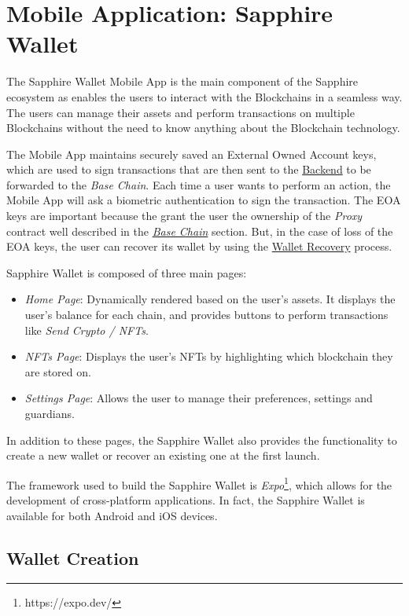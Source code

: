 \section{Mobile Application: Sapphire Wallet}
\label{sec:mobile_application}

The Sapphire Wallet Mobile App is the main component of the Sapphire ecosystem as enables the users to interact with the Blockchains in a seamless way. The users can manage their assets and perform transactions on multiple Blockchains without the need to know anything about the Blockchain technology.

The Mobile App maintains securely saved an External Owned Account keys, which are used to sign transactions that are then sent to the \hyperref[sec:backend]{Backend} to be forwarded to the \textit{Base Chain}. Each time a user wants to perform an action, the Mobile App will ask a biometric authentication to sign the transaction. The EOA keys are important because the grant the user the ownership of the \textit{Proxy} contract well described in the \hyperref[subsec:base_chain]{\textit{Base Chain}} section. But, in the case of loss of the EOA keys, the user can recover its wallet by using the \hyperref[subsec:wallet_recovery]{Wallet Recovery} process.

Sapphire Wallet is composed of three main pages:
\begin{itemize}
    \item \textit{Home Page}: Dynamically rendered based on the user's assets. It displays the user's balance for each chain, and provides buttons to perform transactions like \textit{Send Crypto / NFTs}.
    \item \textit{NFTs Page}: Displays the user's NFTs by highlighting which blockchain they are stored on.
    \item \textit{Settings Page}: Allows the user to manage their preferences, settings and guardians. 
\end{itemize}

In addition to these pages, the Sapphire Wallet also provides the functionality to create a new wallet or recover an existing one at the first launch.

The framework used to build the Sapphire Wallet is \textit{Expo}\footnote{https://expo.dev/}, which allows for the development of cross-platform applications. In fact, the Sapphire Wallet is available for both Android and iOS devices.

\subsection{Wallet Creation}
\label{subsec:wallet_creation}

